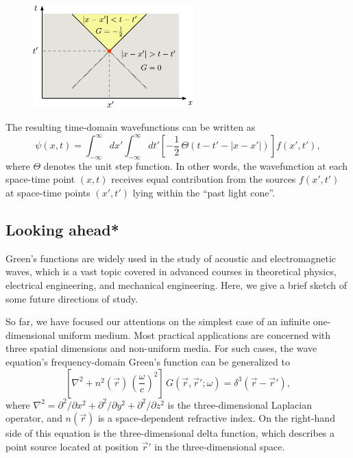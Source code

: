 \documentclass[10pt,a4paper]{article}
\begin{document}
\begin{figure}[ht]
  \centering\includegraphics[width=0.55\textwidth]{spacetime_diagram}
\end{figure}

The resulting time-domain wavefunctions can be written as
\begin{equation}
\psi(x,t) = \int_{-\infty}^\infty dx' \int_{-\infty}^\infty dt' \left[-\frac{1}{2}\,\Theta(t-t' - |x-x'|)\right] f(x',t'),
\end{equation}
where $\Theta$ denotes the unit step function. In other words, the
wavefunction at each space-time point $(x,t)$ receives equal
contribution from the sources $f(x',t')$ at space-time points
$(x',t')$ lying within the ``past light cone''.

\subsection{Looking ahead*}\label{looking-ahead}

Green's functions are widely used in the study of acoustic and
electromagnetic waves, which is a vast topic covered in advanced
courses in theoretical physics, electrical engineering, and mechanical
engineering. Here, we give a brief sketch of some future directions of
study.

So far, we have focused our attentions on the simplest case of an
infinite one-dimensional uniform medium. Most practical applications
are concerned with three spatial dimensions and non-uniform media. For
such cases, the wave equation's frequency-domain Green's function can
be generalized to
\begin{equation}
\left[\nabla^2 + n^2(\vec{r}) \, \left(\frac{\omega}{c}\right)^2\right]\, G(\vec{r},\vec{r}';\omega) = \delta^3(\vec{r}-\vec{r}'),
\end{equation}
where $\nabla^2 = \partial^2/\partial x^2 + \partial^2/\partial y^2 +
\partial^2/\partial z^2$ is the three-dimensional Laplacian operator,
and $n(\vec{r})$ is a space-dependent refractive index. On the
right-hand side of this equation is the three-dimensional delta
function, which describes a point source located at position
$\vec{r}'$ in the three-dimensional space.
\end{document}
